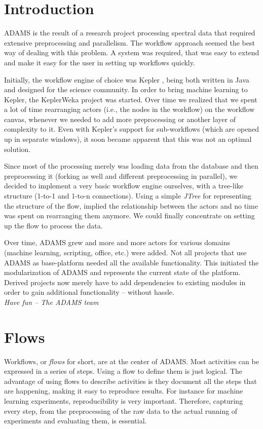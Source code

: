 

\chapter{Introduction}
ADAMS is the result of a research project processing spectral data that
required extensive preprocessing and parallelism. The workflow approach seemed
the best way of dealing with this problem. A system was required, that was easy
to extend and make it easy for the user in setting up workflows quickly.

Initially, the workflow engine of choice was Kepler \cite{kepler}, being both
written in Java and designed for the science community. In order to bring
machine learning to Kepler, the KeplerWeka project \cite{keplerweka} was
started. Over time we realized that we spent a lot of time rearranging actors
(i.e., the nodes in the workflow) on the workflow canvas, whenever we needed to
add more preprocessing or another layer of complexity to it. Even with Kepler's
support for sub-workflows (which are opened up in separate windows), it soon
became apparent that this was not an optimal solution.

Since most of the processing merely was loading data from the database and
then preprocessing it (forking as well and different preprocessing in
parallel), we decided to implement a very basic workflow engine ourselves, with
a tree-like structure (1-to-1 and 1-to-n connections). Using a simple
\textit{JTree} for representing the structure of the flow, implied the
relationship between the actors and no time was spent on rearranging them
anymore. We could finally concentrate on setting up the flow to process the
data.

Over time, ADAMS grew and more and more actors for various domains (machine
learning, scripting, office, etc.) were added. Not all projects that use ADAMS
as base-platform needed all the available functionality. This initiated the
modularization of ADAMS and represents the current state of the platform.
Derived projects now merely have to add dependencies to existing modules in
order to gain additional functionality -- without hassle. \\

\hfill \textit{Have fun -- The ADAMS team}


\chapter{Flows}
\label{flows}
Workflows, or \textit{flows} for short, are at the center of ADAMS. Most
activities can be expressed in a series of steps. Using a flow to define them is
just logical. The advantage of using flows to describe activities is they
document all the steps that are happening, making it easy to reproduce results.
For instance for machine learning experiments, reproducibility is very important. Therefore,
capturing every step, from the preprocessing of the raw data to the actual
running of experiments and evaluating them, is essential.

